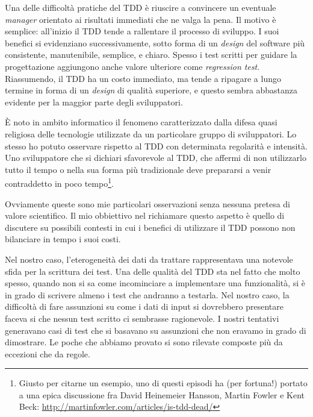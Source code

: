 \documentclass[12pt]{report}
\begin{document}
Una delle difficoltà pratiche del TDD è riuscire a convincere un eventuale
\textit{manager} orientato ai risultati immediati che ne valga la pena. 
Il motivo è semplice: all'inizio il TDD tende a rallentare 
il processo di sviluppo. 
I suoi benefici si evidenziano successivamente, 
sotto forma di un \textit{design} del software più consistente,
manutenibile, semplice, e chiaro. Spesso i test scritti per guidare 
la progettazione aggiungono anche valore ulteriore 
come \textit{regression test}. Riassumendo, 
il TDD ha un costo immediato, ma tende a ripagare a lungo
termine in forma di un \textit{design} di qualità superiore, e questo
sembra abbastanza evidente per la maggior parte degli sviluppatori.

È noto in ambito informatico il fenomeno caratterizzato
dalla difesa quasi religiosa delle tecnologie utilizzate da un
particolare gruppo di sviluppatori. Lo stesso ho potuto
osservare rispetto al TDD con determinata regolarità e intensità.
Uno sviluppatore che si dichiari
sfavorevole al TDD, che affermi di non utilizzarlo tutto il tempo o 
nella sua forma più tradizionale deve prepararsi a venir 
contraddetto in poco tempo\footnote{
	Giusto per citarne un esempio,
	uno di questi episodi ha (per fortuna!)
	portato a una epica discussione fra David Heinemeier Hansson,
	Martin Fowler e Kent Beck: 
	\url{http://martinfowler.com/articles/is-tdd-dead/}
}.
	
Ovviamente queste sono mie particolari osservazioni senza nessuna
pretesa di valore scientifico. Il mio obbiettivo nel
richiamare questo aspetto è quello di discutere su possibili
contesti in cui i benefici di utilizzare il TDD possono non bilanciare
in tempo  i suoi costi. 

Nel nostro caso, l'eterogeneità dei dati da trattare rappresentava 
una notevole sfida per la scrittura dei test. Una delle qualità 
del TDD sta nel fatto che molto spesso, quando non si sa 
come incominciare a implementare una funzionalità, si è in
grado di scrivere almeno i test che andranno a testarla. Nel nostro
caso, la difficoltà di fare assunzioni su come i dati di input 
si dovrebbero presentare faceva si che nessun test scritto 
ci sembrasse ragionevole. I nostri tentativi generavano casi di 
test che si basavano su assunzioni che non eravamo in grado di 
dimostrare. Le poche che abbiamo provato si sono rilevate composte 
più da eccezioni che da regole.
\end{document}

